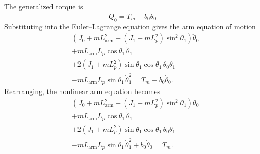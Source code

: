 \documentclass[a4paper,11pt]{article}
\newcommand{\La}{L_{\mathrm{arm}}}
\begin{document}
The generalized torque is
\begin{equation}
  Q_0 = T_m - b_0 \dot\theta_0
\end{equation}
Substituting into the Euler--Lagrange equation gives the arm equation of motion
\begin{equation}
\begin{aligned}
  & \left(J_0 + m \La^2 + \left(J_1 + m L_p^2\right)\sin^2\theta_1\right)\ddot\theta_0\\
  & + m \La L_p \cos\theta_1\,\ddot\theta_1\\
  & + 2\left(J_1 + m L_p^2\right)\sin\theta_1 \cos\theta_1\,\dot\theta_0 \dot\theta_1\\
  & - m \La L_p \sin\theta_1\,\dot\theta_1^2 = T_m - b_0 \dot\theta_0 .
\end{aligned}
\end{equation}
Rearranging, the nonlinear arm equation becomes
\begin{equation}
\begin{aligned}
  & \left(J_0 + m \La^2 + \left(J_1 + m L_p^2\right)\sin^2\theta_1\right)\ddot\theta_0\\
  & + m \La L_p \cos\theta_1\,\ddot\theta_1\\
  & + 2\left(J_1 + m L_p^2\right)\sin\theta_1 \cos\theta_1\,\dot\theta_0 \dot\theta_1\\
  & - m \La L_p \sin\theta_1\,\dot\theta_1^2 + b_0 \dot\theta_0 = T_m .
\end{aligned}
\label{eq:arm_nl}
\end{equation}
\end{document}

